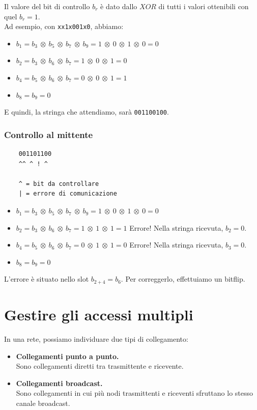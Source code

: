 Il valore del bit di controllo $b_r$ è dato dallo $XOR$ di tutti i valori ottenibili con quel $b_r=1$.\\
Ad esempio, con \verb|xx1x001x0|, abbiamo:
\begin{itemize}
	\item $b_1 = b_3 \ \otimes \ b_5 \ \otimes \ b_7 \ \otimes \ b_9 =  1 \ \otimes \ 0 \ \otimes \ 1 \ \otimes \ 0 = 0$
	\item $b_2 = b_3 \ \otimes \ b_6 \ \otimes \ b_7 = 1 \ \otimes \ 0 \ \otimes \ 1  = 0$
	\item $b_4 = b_5 \ \otimes \ b_6 \ \otimes \ b_7 = 0 \ \otimes \ 0 \ \otimes \ 1  = 1$
	\item $b_8 = b_9 = 0 $
\end{itemize}
E quindi, la stringa che attendiamo, sarà \verb|001100100|.

\subsubsection{Controllo al mittente}
\begin{verbatim}
	001101100
	^^ ^ ! ^
	
	^ = bit da controllare
	| = errore di comunicazione
\end{verbatim}

\begin{itemize}
	\item $b_1 = b_3 \ \otimes \ b_5 \ \otimes \ b_7 \ \otimes \ b_9 =  1 \ \otimes \ 0 \ \otimes \ 1 \ \otimes \ 0 = 0$
	\item $b_2 = b_3 \ \otimes \ b_6 \ \otimes \ b_7 = 1 \ \otimes \ 1 \ \otimes \ 1  = 1$ Errore! Nella stringa ricevuta, $b_2=0$.
	\item $b_4 = b_5 \ \otimes \ b_6 \ \otimes \ b_7 = 0 \ \otimes \ 1 \ \otimes \ 1  = 0$ Errore! Nella stringa ricevuta, $b_3=0$.
	\item $b_8 = b_9 = 0 $
\end{itemize}
L'errore è situato nello slot $b_{2+4} = b_6$. Per correggerlo, effettuiamo un bitflip.
\newpage

\section{Gestire gli accessi multipli}
In una rete, possiamo individuare due tipi di collegamento:
\begin{itemize}
	\item \textbf{Collegamenti punto a punto.}\\
	Sono collegamenti diretti tra trasmittente e ricevente.
	\item \textbf{Collegamenti broadcast.}\\
	Sono collegamenti in cui più nodi trasmittenti e riceventi sfruttano lo stesso canale broadcast.
\end{itemize}

